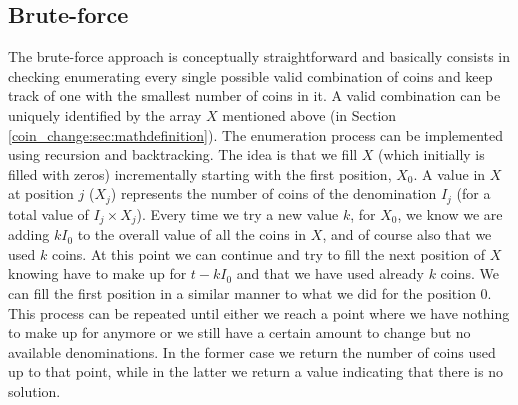 \subsection{Brute-force}
\label{coin_change:sec:bruteforce}
The brute-force approach is conceptually straightforward and basically consists in checking enumerating every single possible valid combination of coins
and keep track of one with the smallest number of coins in it. A valid combination can be uniquely identified by the array $X$  mentioned above (in Section \ref{coin_change:sec:mathdefinition}).
The enumeration process can be implemented using recursion and backtracking. 
The idea is that we fill $X$ (which initially is filled with zeros) incrementally starting with the first position, $X_0$. A value in $X$ at position $j$ ($X_j$) represents the number of coins of the denomination $I_j$ (for a total value of $I_j\times X_j$). 
Every time we try a new value $k$, for $X_0$, we know we are adding $kI_0$ to the overall value of all the coins in $X$, and of course also that we used $k$ coins.
At this point we can continue and try to fill the next position of $X$ knowing have to make up for $t-kI_0$ and that we have used already $k$ coins. We can fill the first position in a similar manner to what we did for the position $0$.
This process can be repeated until either we reach a point where we have nothing to make up for anymore or we still have a certain amount to change but no available denominations.
In the former case we return the number of coins used up to that point, while in the latter we return a value indicating that there is no solution.


